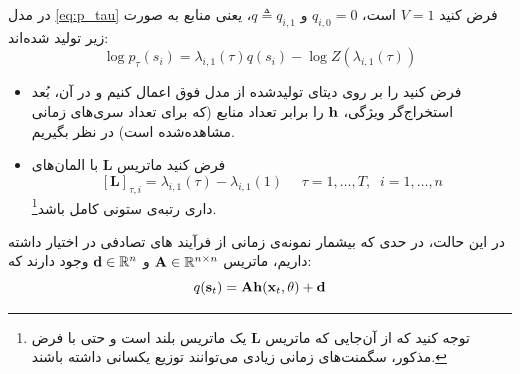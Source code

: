 \begin{theorem}
در مدل 
\eqref{eq:p_tau}
فرض کنید 
$V = 1$
است،
$q_{i, 0} = 0$
و
$q \triangleq q_{i, 1}$،
یعنی منابع به صورت زیر تولید شده‌اند:
\begin{equation}
\log p_\tau(s_i)=    \lambda_{i,1}(\tau) q(s_i) - \log Z( \lambda_{i,1}(\tau))
\label{eq:p_tau_simple}
\end{equation}
\begin{itemize}
\item
فرض کنید 
را بر  روی دیتای تولیدشده از مدل فوق اعمال کنیم و در آن، بُعد استخراج‌گر ویژگی، 
$\mathbf{h}$
را برابر تعداد منابع (که برای تعداد سری‌های زمانی مشاهده‌شده است) در نظر بگیریم. 
\item
فرض کنید ماتریس 
$\mathbf{L}$
با المان‌های 
$$[\mathbf{L}]_{\tau, i} = 
\lambda_{i, 1}(\tau) - \lambda_{i, 1}(1) \
\;\;\;\;
\tau = 1, \dots, T, \;\;
i = 1, \dots, n
$$
داری رتبه‌ی ستونی کامل باشد\footnote{
	توجه کنید که از آن‌جایی که ماتریس 
$\mathbf{L}$
یک ماتریس بلند است و حتی با فرض مذکور، سگمنت‌های زمانی زیادی می‌توانند توزیع یکسانی داشته باشند.}.
\end{itemize}
در این حالت، در حدی که بیشمار نمونه‌ی زمانی از فرآیند های تصادفی در اختیار داشته داریم، ماتریس 
$\mathbf{A} \in \mathbb{R}^{n\times n}$
و
$\mathbf{d} \in \mathbb{R}^n$
وجود دارند که:
\begin{equation}
q(\mathbf{s}_t) = \mathbf{Ah}(\mathbf{x}_t, \theta) + \mathbf{d}
\end{equation}
\end{theorem}

